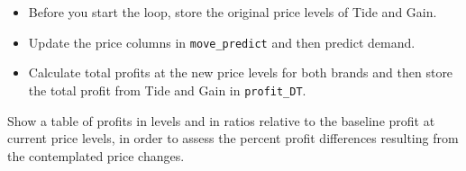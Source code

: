 \documentclass[
]{article}
\newenvironment{Shaded}{\begin{snugshade}}{\end{snugshade}}
\newcommand{\FunctionTok}[1]{\textcolor[rgb]{0.13,0.29,0.53}{\textbf{#1}}}
\newcommand{\NormalTok}[1]{#1}
\newcommand{\OtherTok}[1]{\textcolor[rgb]{0.56,0.35,0.01}{#1}}
\newcommand{\SpecialCharTok}[1]{\textcolor[rgb]{0.81,0.36,0.00}{\textbf{#1}}}
\newcommand{\StringTok}[1]{\textcolor[rgb]{0.31,0.60,0.02}{#1}}
\providecommand{\tightlist}{%
  \setlength{\itemsep}{0pt}\setlength{\parskip}{0pt}}
\begin{document}
\begin{itemize}
\tightlist
\item
  Before you start the loop, store the original price levels of Tide and
  Gain.
\item
  Update the price columns in \texttt{move\_predict} and then predict
  demand.
\item
  Calculate total profits at the new price levels for both brands and
  then store the total profit from Tide and Gain in \texttt{profit\_DT}.
\end{itemize}

\medskip

Show a table of profits in levels and in ratios relative to the baseline
profit at current price levels, in order to assess the percent profit
differences resulting from the contemplated price changes.

\begin{Shaded}
\end{Shaded}
\end{document}
